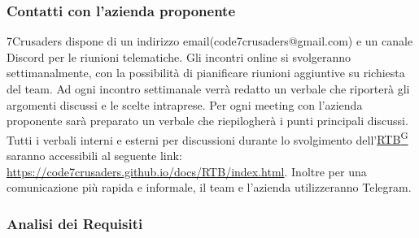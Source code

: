 \subsubsection{Contatti con l’azienda proponente}
7Crusaders dispone di un indirizzo email(code7crusaders@gmail.com) e un canale Discord per le riunioni telematiche. 
Gli incontri online si svolgeranno settimanalmente, con la possibilità di pianificare riunioni aggiuntive su richiesta del team.
Ad ogni incontro settimanale verrà redatto un verbale che riporterà gli argomenti discussi e le scelte intraprese.
Per ogni meeting con l’azienda proponente sarà preparato un verbale che riepilogherà i punti principali discussi. 
Tutti i verbali interni e esterni per discussioni durante lo svolgimento dell'\href{https://code7crusaders.github.io/docs/RTB/documentazione_interna/glossario.html#rtb-requirements-and-technology-baseline}{RTB\textsuperscript{G}} saranno accessibili al seguente link: \url{https://code7crusaders.github.io/docs/RTB/index.html}.
Inoltre per una comunicazione più rapida e informale, il team e l'azienda utilizzeranno Telegram.

\subsubsection{Analisi dei Requisiti}

